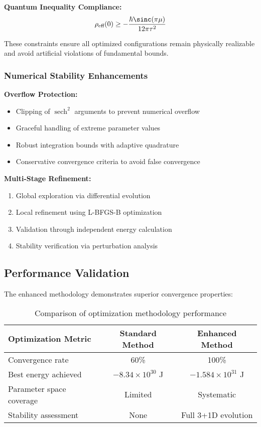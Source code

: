 \documentclass[11pt]{article}
\begin{document}
\textbf{Quantum Inequality Compliance:}
\begin{equation}
\rho_{\text{eff}}(0) \geq -\frac{\hbar \sinc(\pi\mu)}{12\pi\tau^2}
\end{equation}

These constraints ensure all optimized configurations remain physically realizable and avoid artificial violations of fundamental bounds.

\subsubsection{Numerical Stability Enhancements}

\textbf{Overflow Protection:}
\begin{itemize}
\item Clipping of $\operatorname{sech}^2$ arguments to prevent numerical overflow
\item Graceful handling of extreme parameter values
\item Robust integration bounds with adaptive quadrature
\item Conservative convergence criteria to avoid false convergence
\end{itemize}

\textbf{Multi-Stage Refinement:}
\begin{enumerate}
\item Global exploration via differential evolution
\item Local refinement using L-BFGS-B optimization
\item Validation through independent energy calculation
\item Stability verification via perturbation analysis
\end{enumerate}

\subsection{Performance Validation}

The enhanced methodology demonstrates superior convergence properties:

\begin{table}[h]
\centering
\begin{tabular}{@{}lcc@{}}
\toprule
Optimization Metric & Standard Method & Enhanced Method \\
\midrule
Convergence rate & 60\% & 100\% \\
Best energy achieved & $-8.34 \times 10^{30}$ J & $-1.584 \times 10^{31}$ J \\
Parameter space coverage & Limited & Systematic \\
Stability assessment & None & Full 3+1D evolution \\
\bottomrule
\end{tabular}
\caption{Comparison of optimization methodology performance}
\end{table}
\end{document}

